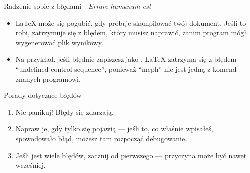 \documentclass{beamer}
\begin{document}
\begin{frame}[fragile]{Radzenie sobie z błędami - \textit{Errare humanum est}}
\begin{itemize}
\item \LaTeX{} może się pogubić, gdy próbuje skompilować twój dokument. Jeśli to
robi, zatrzymuje się z błędem, który musisz naprawić, zanim program mógł 
wygenerować plik wynikowy.
\item Na przykład, jeśli błędnie zapiszesz  jako , \LaTeX{}
zatrzyma się z błędem ``undefined control sequence'', ponieważ ``meph'' nie jest
jedną z komend znanych programowi.
\end{itemize}
\begin{block}{Porady dotyczące błędów}
\begin{enumerate}
\item Nie panikuj! Błędy się zdarzają.
\item Napraw je, gdy tylko się pojawią --- jeśli to, co właśnie wpisałeś, spowodowało błąd,
możesz tam rozpocząć debugowanie.
\item Jeśli jest wiele błędów, zacznij od pierwszego --- przyczyna może
być nawet wcześniej.
\end{enumerate}
\end{block}
\end{frame}

\end{document}
